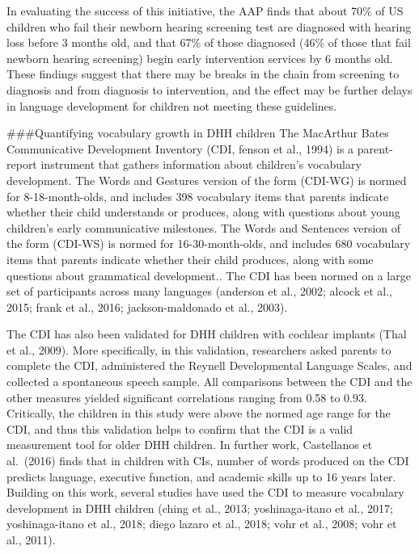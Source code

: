 \documentclass[
]{article}
\begin{document}
In evaluating the success of this initiative, the AAP finds that about
70\% of US children who fail their newborn hearing screening test are
diagnosed with hearing loss before 3 months old, and that 67\% of those
diagnosed (46\% of those that fail newborn hearing screening) begin
early intervention services by 6 months old. These findings suggest that
there may be breaks in the chain from screening to diagnosis and from
diagnosis to intervention, and the effect may be further delays in
language development for children not meeting these guidelines.

\#\#\#Quantifying vocabulary growth in DHH children The MacArthur Bates
Communicative Development Inventory (CDI, fenson et al., 1994) is a
parent-report instrument that gathers information about children's
vocabulary development. The Words and Gestures version of the form
(CDI-WG) is normed for 8-18-month-olds, and includes 398 vocabulary
items that parents indicate whether their child understands or produces,
along with questions about young children's early communicative
milestones. The Words and Sentences version of the form (CDI-WS) is
normed for 16-30-month-olds, and includes 680 vocabulary items that
parents indicate whether their child produces, along with some questions
about grammatical development.. The CDI has been normed on a large set
of participants across many languages (anderson et al., 2002; alcock et
al., 2015; frank et al., 2016; jackson-maldonado et al., 2003).

The CDI has also been validated for DHH children with cochlear implants
(Thal et al., 2009). More specifically, in this validation, researchers
asked parents to complete the CDI, administered the Reynell
Developmental Language Scales, and collected a spontaneous speech
sample. All comparisons between the CDI and the other measures yielded
significant correlations ranging from 0.58 to 0.93. Critically, the
children in this study were above the normed age range for the CDI, and
thus this validation helps to confirm that the CDI is a valid
measurement tool for older DHH children. In further work, Castellanos et
al.~(2016) finds that in children with CIs, number of words produced on
the CDI predicts language, executive function, and academic skills up to
16 years later. Building on this work, several studies have used the CDI
to measure vocabulary development in DHH children (ching et al., 2013;
yoshinaga-itano et al., 2017; yoshinaga-itano et al., 2018; diego lazaro
et al., 2018; vohr et al., 2008; vohr et al., 2011).
\end{document}
